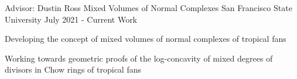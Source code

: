 \documentclass[../omelveny-cv]{subfiles}
\begin{document}

\begin{cventries}

    \cventry
    {Advisor: Dustin Ross} %
    {Mixed Volumes of Normal Complexes} %
    {San Francisco State University} %
    {July 2021 - Current Work} %
    {
        \begin{cvitems} %
            \item {Developing the concept of mixed volumes of normal complexes of tropical fans}
            \item {Working towards geometric proofs of the log-concavity of mixed degrees of divisors in Chow rings of tropical fans}
        \end{cvitems}
    }

\end{cventries}
\end{document}
